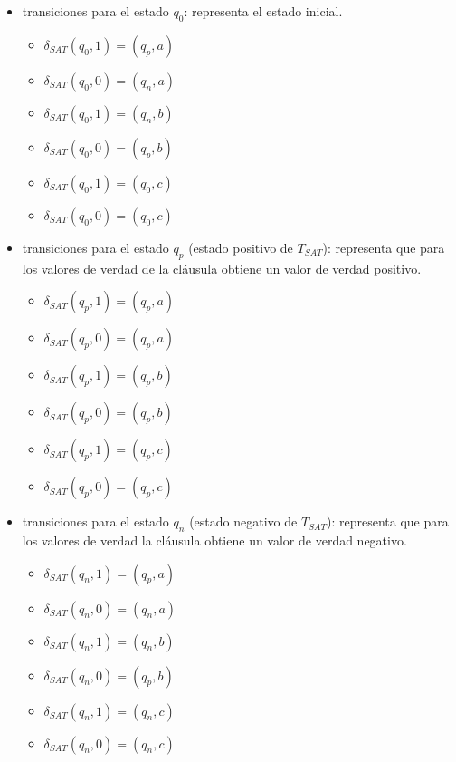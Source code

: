 \documentclass{book}
\begin{document}
\begin{itemize}
    \item  transiciones para el estado $q_0$: representa el estado inicial.
          \begin{multicols}{2}
              \begin{itemize}
                  \item $\delta_{SAT}(q_0,1)=(q_p,a)$
                  \item $\delta_{SAT}(q_0,0)=(q_n,a)$
                  \item $\delta_{SAT}(q_0,1)=(q_n,b)$
                  \item $\delta_{SAT}(q_0,0)=(q_p,b)$
                  \item $\delta_{SAT}(q_0,1)=(q_0,c)$
                  \item $\delta_{SAT}(q_0,0)=(q_0,c)$
              \end{itemize}
          \end{multicols}

    \item  transiciones para el estado $q_p$ (estado positivo de $T_{SAT}$): representa que para los valores de verdad de la cláusula obtiene un valor de verdad positivo.
          \begin{multicols}{2}
              \begin{itemize}
                  \item $\delta_{SAT}(q_{p},1)=(q_{p},a)$
                  \item $\delta_{SAT}(q_{p},0)=(q_{p},a)$
                  \item $\delta_{SAT}(q_{p},1)=(q_{p},b)$
                  \item $\delta_{SAT}(q_{p},0)=(q_{p},b)$
                  \item $\delta_{SAT}(q_{p},1)=(q_{p},c)$
                  \item $\delta_{SAT}(q_{p},0)=(q_{p},c)$
              \end{itemize}
          \end{multicols}

    \item  transiciones para el estado $q_n$ (estado negativo de $T_{SAT}$): representa que para los valores de verdad la cláusula obtiene un valor de verdad negativo.
          \begin{multicols}{2}
              \begin{itemize}
                  \item $\delta_{SAT}(q_{n},1)=(q_{p},a)$
                  \item $\delta_{SAT}(q_{n},0)=(q_{n},a)$
                  \item $\delta_{SAT}(q_{n},1)=(q_{n},b)$
                  \item $\delta_{SAT}(q_{n},0)=(q_{p},b)$
                  \item $\delta_{SAT}(q_{n},1)=(q_{n},c)$
                  \item $\delta_{SAT}(q_{n},0)=(q_{n},c)$
              \end{itemize}
          \end{multicols}
\end{itemize}
\end{document}
